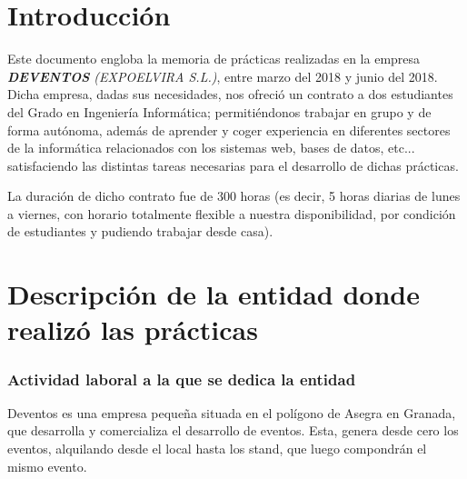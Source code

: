\date{\normalsize\today} %



	\maketitle
	
	\newpage
	\tableofcontents
	\newpage
	
	\part{Introducción}		\setcounter{section}{0}
	
		Este documento engloba la memoria de prácticas realizadas en la empresa \textit{\textbf{DEVENTOS} (EXPOELVIRA S.L.)}, entre marzo del 2018 y junio del 2018.\\
		
		Dicha empresa, dadas sus necesidades, nos ofreció un contrato a dos estudiantes del Grado en Ingeniería Informática; permitiéndonos trabajar en grupo y de forma autónoma, además de aprender y coger experiencia en diferentes sectores de la informática relacionados con los sistemas web, bases de datos, etc... satisfaciendo las distintas tareas necesarias para el desarrollo de dichas prácticas.\newline
		
		La duración de dicho contrato fue de 300 horas (es decir, 5 horas diarias de lunes a viernes, con horario totalmente flexible a nuestra disponibilidad, por condición de estudiantes y pudiendo trabajar desde casa). 
		
		\newpage
	
	\part{Descripción de la entidad donde realizó las prácticas}	\setcounter{section}{0}
	
		\section{Actividad laboral a la que se dedica la entidad}
		Deventos es una empresa pequeña situada en el polígono de Asegra en Granada, que desarrolla y comercializa el desarrollo de eventos. Esta, genera desde cero los eventos, alquilando desde el local hasta los stand, que luego compondrán el mismo evento.\newline
		
